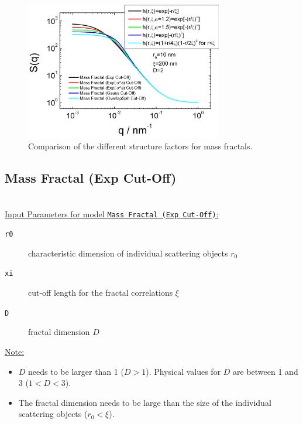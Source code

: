 \begin{figure}[htb]
\begin{center}
\includegraphics[width=0.768\textwidth,height=0.488\textwidth]{../images/structure_factor/MassFractals/ComparingSQMassFractals.png}
\end{center}
\caption{Comparison of the different structure factors for mass
fractals.} \label{fig:MassFractCompare}
\end{figure}


\clearpage
\subsection{Mass Fractal (Exp Cut-Off)}
~\\

\underline{Input Parameters for model \texttt{Mass Fractal (Exp Cut-Off)}:}
\begin{description}
\item[\texttt{r0}] characteristic dimension of individual scattering objects $r_0$
\item[\texttt{xi}] cut-off length for the fractal correlations $\xi$
\item[\texttt{D}] fractal dimension $D$
\end{description}

\underline{Note:}
\begin{itemize}
\item $D$ needs to be larger than 1 ($D>1$). Physical values for $D$ are between 1 and 3 ($1<D<3$).
\item The fractal dimension needs to be large than the size of the individual scattering objects ($r_0 < \xi$).
\end{itemize}

